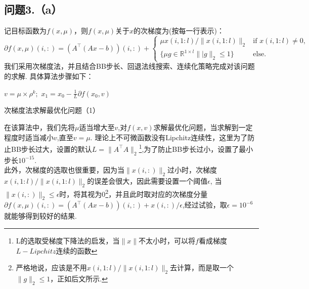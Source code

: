 \documentclass[10pt,a4paper]{article}
\begin{document}
\subsection{问题3.（a）}
\indent 记目标函数为$f(x,\mu)$，则$f(x,\mu)$关于$x$的次梯度为(按每一行表示)：
$$\partial f(x,\mu)(i,:)=(A^{\top}(Ax-b))(i,:)+
\begin{cases}
	\mu x(i,1:l)/\|x(i,1:l)\|_{2} & \text{if } x(i,1:l)\neq 0,\\
	\{\mu g\in \mathbb{R}^{1\times l}\||g\|_{2}\leq 1\} & \text{else.}
\end{cases}$$
我们采用次梯度法，并且结合BB步长、回退法线搜索、连续化策略完成对该问题的求解. 具体算法步骤如下：
\begin{algorithm}[H]
	\SetAlgoLined
	$v=\mu\times\rho^{k};$
	$x_{1}=x_{0}-\frac{1}{L}\partial f(x_{0},v)$\;
	
	\caption{次梯度法求解最优化问题（1）}
	\label{alg 1}
\end{algorithm}
在该算法中，我们先将$\mu$适当增大至$v$,对$f(x,v)$求解最优化问题，当求解到一定程度时适当减小$v$,直至$v=\mu$. 理论上不可微函数没有Lipchitz连续性，这里为了防止BB步长过大，设置的默认$L=\|A^{\top}A\|_{2}$\footnote{L的选取受梯度下降法的启发，当$\|x\|$不太小时，可以将$f$看成梯度$L-Lipchitz$连续的函数},为了防止BB步长过小，设置了最小步长$10^{-15}$.\\
\indent 此外，次梯度的选取也很重要，因为当$\|x(i,:)\|_{2}$过小时，次梯度$x(i,1:l)/\|x(i,1:l)\|_{2}$的误差会很大，因此需要设置一个阈值$\epsilon$, 当$\|x(i,:)\|_{2}\leq\epsilon$时，将其视为0\footnote{严格地说，应该是不用$ x(i,1:l)/\|x(i,1:l)\|_{2}$去计算，而是取一个$\|g\|_{2}\leq 1$，正如后文所示.}，并且此时取对应的次梯度分量$\partial f(x,\mu)(i,:)=(A^{\top}(Ax-b))(i,:)+x(i,:)/\epsilon$,经过试验，取$\epsilon=10^{-6}$就能够得到较好的结果.\\
\end{document}
